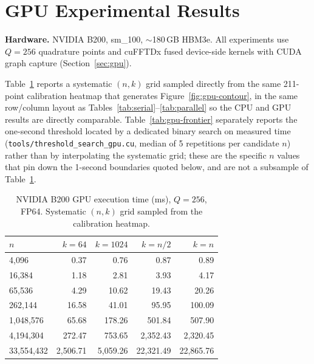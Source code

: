 \documentclass[11pt]{article}
\begin{document}
\section{GPU Experimental Results}\label{sec:gpu-results}

\textbf{Hardware.} NVIDIA B200, sm\_100, ${\sim}$180\,GB HBM3e. All
experiments use $Q = 256$ quadrature points and cuFFTDx fused device-side
kernels with CUDA graph capture (Section~\ref{sec:gpu}).

Table~\ref{tab:gpu} reports a systematic $(n,k)$ grid sampled directly from
the same 211-point calibration heatmap that generates
Figure~\ref{fig:gpu-contour}, in the same row/column layout as
Tables~\ref{tab:serial}--\ref{tab:parallel} so the CPU and GPU results are
directly comparable. Table~\ref{tab:gpu-frontier} separately reports the
one-second threshold located by a dedicated binary search on measured time
(\texttt{tools/threshold\_search\_gpu.cu}, median of 5 repetitions per
candidate $n$) rather than by interpolating the systematic grid; these are
the specific $n$ values that pin down the 1-second boundaries quoted below,
and are not a subsample of Table~\ref{tab:gpu}.

\begin{table}[t]
\centering
\caption{NVIDIA B200 GPU execution time (ms), $Q = 256$, FP64. Systematic
  $(n,k)$ grid sampled from the calibration heatmap.}
\label{tab:gpu}
\begin{tabular}{@{}l rrrr@{}}
\toprule
$n$ & $k{=}64$ & $k{=}1024$ & $k{=}n/2$ & $k{=}n$ \\
\midrule
4{,}096        & 0.37     & 0.76     & 0.87      & 0.89 \\
16{,}384       & 1.18     & 2.81     & 3.93      & 4.17 \\
65{,}536       & 4.29     & 10.62    & 19.43     & 20.26 \\
262{,}144      & 16.58    & 41.01    & 95.95     & 100.09 \\
1{,}048{,}576  & 65.68    & 178.26   & 501.84    & 507.90 \\
4{,}194{,}304  & 272.47   & 753.65   & 2{,}352.43 & 2{,}320.45 \\
33{,}554{,}432 & 2{,}506.71 & 5{,}059.26 & 22{,}321.49 & 22{,}865.76 \\
\bottomrule
\end{tabular}
\end{table}
\end{document}
